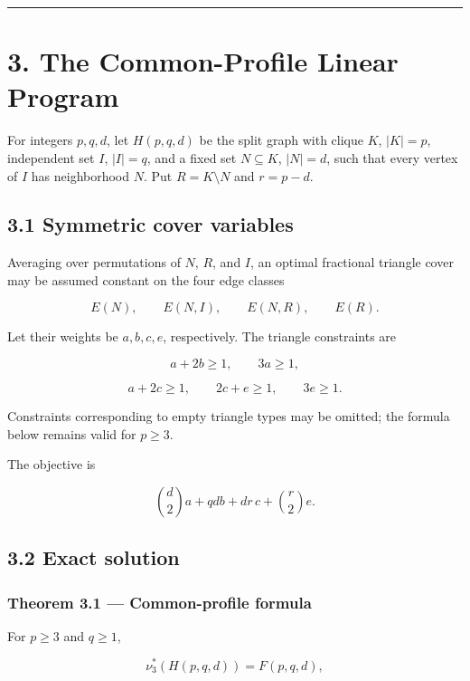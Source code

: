 \documentclass[
  11pt,
]{article}
\begin{document}
\begin{center}\rule{0.5\linewidth}{0.5pt}\end{center}

\section{3. The Common-Profile Linear
Program}\label{the-common-profile-linear-program}

For integers \(p,q,d\), let \(H(p,q,d)\) be the split graph with clique
\(K\), \(|K|=p\), independent set \(I\), \(|I|=q\), and a fixed set
\(N\subseteq K\), \(|N|=d\), such that every vertex of \(I\) has
neighborhood \(N\). Put \(R=K\setminus N\) and \(r=p-d\).

\subsection{3.1 Symmetric cover
variables}\label{symmetric-cover-variables}

Averaging over permutations of \(N\), \(R\), and \(I\), an optimal
fractional triangle cover may be assumed constant on the four edge
classes

\[
E(N),
\qquad E(N,I),
\qquad E(N,R),
\qquad E(R).
\]

Let their weights be \(a,b,c,e\), respectively. The triangle constraints
are

\[
a+2b\ge1,
\qquad
3a\ge1,
\tag{3.1}
\]

\[
a+2c\ge1,
\qquad
2c+e\ge1,
\qquad
3e\ge1.
\tag{3.2}
\]

Constraints corresponding to empty triangle types may be omitted; the
formula below remains valid for \(p\ge3\).

The objective is

\[
\binom d2a+qdb+dr\,c+\binom r2e.
\tag{3.3}
\]

\subsection{3.2 Exact solution}\label{exact-solution}

\subsubsection{Theorem 3.1 --- Common-profile
formula}\label{theorem-3.1-common-profile-formula}

For \(p\ge3\) and \(q\ge1\),

\[
\boxed{
\nu_3^*(H(p,q,d))
=
F(p,q,d),
}
\tag{3.4}
\]
\end{document}
